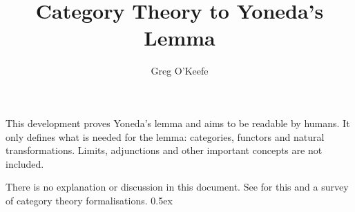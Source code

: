 \documentclass[11pt,a4paper]{article}
\begin{document}
\title{{\bf Category Theory to Yoneda's Lemma}}
\author{Greg O'Keefe}
\maketitle

This development proves Yoneda's lemma and aims to be 
readable by humans.  It only defines what is needed for 
the lemma: categories, functors and natural transformations.
Limits, adjunctions and other important concepts are not 
included.

There is no explanation or discussion in this document.  See
\cite{fcat4cats} for this and a survey of category theory
formalisations.
\tableofcontents
\vspace{1cm}
\parindent 0pt\parskip 0.5ex





\end{document}
